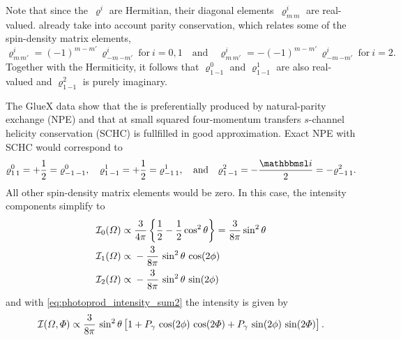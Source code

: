 Note that since the~$\varrho^i$ are Hermitian, their diagonal
elements~$\varrho^i_{m\, m}$ are real-valued.
already take into account parity conservation, which relates some of
the spin-density matrix elements, \ie
\begin{equation}
  \label{eq:parity_rho_photoprod}
  \varrho^i_{m\, m'} = (-1)^{m - m'}\, \varrho^i_{{-m}\, {-m'}}
  ~\text{for}~ i = 0, 1
  \quad\text{and}\quad
  \varrho^i_{m\, m'} = -(-1)^{m - m'}\, \varrho^i_{{-m}\, {-m'}}
  ~\text{for}~ i = 2.
\end{equation}
Together with the Hermiticity, it follows that $\varrho^0_{1\, {-1}}$ and
$\varrho^1_{1\, {-1}}$ are also real-valued and $\varrho^2_{1\, {-1}}$ is
purely imaginary.

The GlueX data show that the \Prho is preferentially produced by
natural-parity exchange (NPE) and that at small squared four-momentum
transfers $s$-channel helicity conservation (SCHC) is fullfilled in
good approximation.  Exact NPE with SCHC would correspond to
\begin{equation}
  \label{eq:spin_dens_npe_schc_rho_photoprod}
  \varrho^0_{1\, 1}
  = +\frac{1}{2}
  = \varrho^0_{{-1}\, {-1}},
  \quad
  \varrho^1_{1\, {-1}}
  = +\frac{1}{2}
  = \varrho^1_{{-1}\, 1},
  \quad\text{and}\quad
  \varrho^2_{1\, {-1}}
  = -\frac{\imag}{2}
  = -\varrho^2_{{-1}\, 1}.
\end{equation}
All other spin-density matrix elements would be zero.  In this case,
the intensity components simplify to
\begin{align}
  \label{eq:intensity_0_npe_schc_rho_photoprod}
  \mathcal{I}_0(\Omega)
  \propto{}& \frac{3}{4 \pi} \cBrk{\frac{1}{2}- \frac{1}{2} \cos^2 \theta}
  = \frac{3}{8 \pi} \sin^2 \theta \\
  \label{eq:intensity_1_npe_schc_rho_photoprod}
  \mathcal{I}_1(\Omega)
  \propto{}& -\frac{3}{8 \pi}\, \sin^2 \theta\, \cos(2 \phi) \\
  \label{eq:intensity_2_npe_schc_rho_photoprod}
  \mathcal{I}_2(\Omega)
  \propto{}& -\frac{3}{8 \pi}\, \sin^2 \theta\, \sin(2 \phi)
\end{align}
and with \cref{eq:photoprod_intensity_sum2} the intensity is given by
\begin{equation}
  \label{eq:intensity_npe_schc_rho_photoprod}
  \mathcal{I}(\Omega, \Phi)
  \propto \frac{3}{8 \pi}\, \sin^2 \theta \sBrk{1
  + P_\gamma\, \cos(2 \phi)\, \cos(2 \Phi)
  + P_\gamma\, \sin(2 \phi)\, \sin(2 \Phi)}.
\end{equation}

